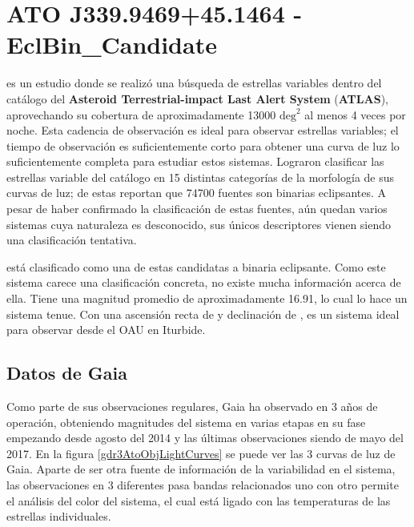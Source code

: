 \section{ATO J339.9469+45.1464 - EclBin\_Candidate}

\citet{atlasATOObjectDiscovery} es un estudio donde se realizó una búsqueda de
estrellas variables dentro del catálogo del \textbf{Asteroid Terrestrial-impact
Last Alert System} (\textbf{ATLAS}), aprovechando su cobertura de
aproximadamente \num{13000} $\mathrm{deg}^2$ al menos 4 veces por noche. Esta
cadencia de observación es ideal para observar estrellas variables; el tiempo de
observación es suficientemente corto para obtener una curva de luz lo
suficientemente completa para estudiar estos sistemas. Lograron clasificar las
estrellas variable del catálogo en 15 distintas categorías de la morfología de
sus curvas de luz; de estas reportan que \num{74700} fuentes son binarias
eclipsantes. A pesar de haber confirmado la clasificación de estas fuentes, aún
quedan varios sistemas cuya naturaleza es desconocido, sus únicos descriptores
vienen siendo una clasificación tentativa.

\textbf{\atoObjId} está clasificado como una de estas candidatas a binaria
eclipsante. Como este sistema carece una clasificación concreta, no existe mucha
información acerca de ella. Tiene una magnitud promedio de aproximadamente
\num{16.91}, lo cual lo hace un sistema tenue. Con una ascensión recta de  y declinación de , \textbf{\atoObjId} es un sistema ideal
para observar desde el OAU en Iturbide.

\newpage

\subsection{Datos de Gaia}

Como parte de sus observaciones regulares, Gaia ha observado \atoObjId en 3 años
de operación, obteniendo magnitudes del sistema en varias etapas en su fase
empezando desde agosto del 2014 y las últimas observaciones siendo de mayo del
2017. En la figura \ref{gdr3AtoObjLightCurves} se puede ver las 3 curvas de luz
de Gaia. Aparte de ser otra fuente de información de la variabilidad en el
sistema, las observaciones en 3 diferentes pasa bandas relacionados uno con otro
permite el análisis del color del sistema, el cual está ligado con las
temperaturas de las estrellas individuales.

